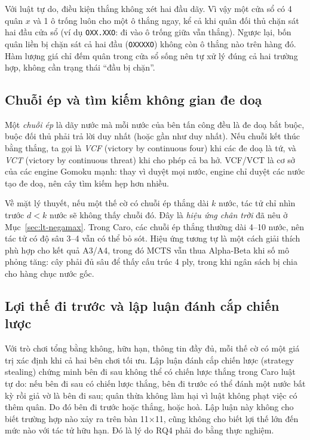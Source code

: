 \begin{nhanxet}
Với luật tự do, điều kiện thắng không xét hai đầu dãy. Vì vậy một cửa sổ có 4 quân $x$ và 1 ô
trống luôn cho một ô thắng ngay, kể cả khi quân đối thủ chặn sát hai đầu cửa sổ (ví dụ
\texttt{OXX.XXO}: đi vào ô trống giữa vẫn thắng). Ngược lại, bốn quân liền bị chặn sát cả hai đầu
(\texttt{OXXXXO}) không còn ô thắng nào trên hàng đó. Hàm lượng giá chỉ đếm quân trong cửa sổ sống
nên tự xử lý đúng cả hai trường hợp, không cần trạng thái ``đầu bị chặn''.
\end{nhanxet}

\subsection{Chuỗi ép và tìm kiếm không gian đe doạ}
\label{sec:lt-vcf}
Một \emph{chuỗi ép} là dãy nước mà mỗi nước của bên tấn công đều là đe doạ bắt buộc, buộc đối
thủ phải trả lời duy nhất (hoặc gần như duy nhất). Nếu chuỗi kết thúc bằng thắng, ta gọi là
\emph{VCF} (victory by continuous four) khi các đe doạ là tứ, và \emph{VCT} (victory by
continuous threat) khi cho phép cả ba hở. VCF/VCT là cơ sở của các engine Gomoku mạnh: thay vì
duyệt mọi nước, engine chỉ duyệt các nước tạo đe doạ, nên cây tìm kiếm hẹp hơn nhiều.

Về mặt lý thuyết, nếu một thế cờ có chuỗi ép thắng dài $k$ nước, tác tử chỉ nhìn trước $d < k$
nước sẽ không thấy chuỗi đó. Đây là \emph{hiệu ứng chân trời} đã nêu ở Mục~\ref{sec:lt-negamax}.
Trong Caro, các chuỗi ép thắng thường dài 4--10 nước, nên tác tử có độ sâu 3--4 vẫn có thể bỏ
sót. Hiệu ứng tương tự là một cách giải thích phù hợp cho kết quả A3/A4, trong đó MCTS vẫn thua
Alpha-Beta khi số mô phỏng tăng: cây phải đủ sâu để thấy cấu trúc 4 ply, trong khi ngân sách bị chia
cho hàng chục nước gốc.

\subsection{Lợi thế đi trước và lập luận đánh cắp chiến lược}
\label{sec:lt-di-truoc}
Với trò chơi tổng bằng không, hữu hạn, thông tin đầy đủ, mỗi thế cờ có một giá trị xác định khi
cả hai bên chơi tối ưu. Lập luận đánh cắp chiến lược (strategy stealing) chứng minh bên đi sau
không thể có chiến lược thắng trong Caro luật tự do: nếu bên đi sau có chiến lược thắng, bên đi
trước có thể đánh một nước bất kỳ rồi giả vờ là bên đi sau; quân thừa không làm hại vì luật
không phạt việc có thêm quân. Do đó bên đi trước hoặc thắng, hoặc hoà. Lập luận này không cho
biết trường hợp nào xảy ra trên bàn 11×11, cũng không cho biết lợi thế lớn đến mức nào với tác
tử hữu hạn. Đó là lý do RQ4 phải đo bằng thực nghiệm.

